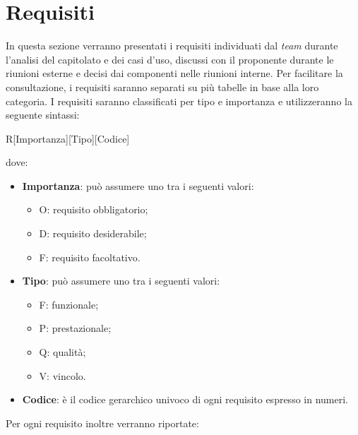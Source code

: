 \newpage
\section{Requisiti}
In questa sezione verranno presentati i requisiti individuati dal \textit{team} durante l'analisi del capitolato e dei casi d'uso, discussi con il proponente durante le riunioni esterne e decisi dai componenti nelle riunioni interne. Per facilitare la consultazione, i
requisiti saranno separati su più tabelle in base alla loro categoria. I requisiti saranno classificati per tipo e importanza e utilizzeranno la seguente sintassi:
\begin{center}
	R[Importanza][Tipo][Codice]
\end{center}
dove:
\begin{itemize}
	\item \textbf{Importanza}: può assumere uno tra i seguenti valori:
	\begin{itemize}
		\item O: requisito obbligatorio;
		\item D: requisito desiderabile;
		\item F: requisito facoltativo.
	\end{itemize}
	\item \textbf{Tipo}: può assumere uno tra i seguenti valori:
	\begin{itemize}
		\item F: funzionale;
		\item P: prestazionale;
		\item Q: qualità;
		\item V: vincolo.
	\end{itemize}
	\item \textbf{Codice}: è il codice gerarchico univoco di ogni requisito espresso in numeri.
\end{itemize} 
Per ogni requisito inoltre verranno riportate:
